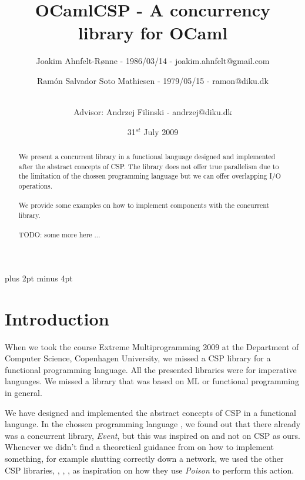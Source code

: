 \documentclass[a4paper,12pt]{article}
\title{OCamlCSP - A concurrency library for OCaml}
\author{Joakim Ahnfelt-Rønne - 1986/03/14 - joakim.ahnfelt@gmail.com \and 
        Ramón Salvador Soto Mathiesen - 1979/05/15 - ramon@diku.dk \and
        \\ Advisor: Andrzej Filinski - andrzej@diku.dk}
\date{31$^{st}$ July 2009}
\begin{document}
\maketitle

\newpage
{}
\begin{abstract}
We present a concurrent library in a functional language designed and
implemented after the abstract concepts of CSP\cite{hoare}. The library does
not offer true parallelism due to the limitation of the chossen programming
language but we can offer overlapping I/O operations.
\\ \\
We provide some examples on how to implement components with the concurrent
library.
\\ \\
TODO: some more here ...
\end{abstract}

\newpage
\setcounter{tocdepth}{2}
\setcounter{secttocdepth}{3}
\dosecttoc \tableofcontents
\newpage

\parindent=0pt
\parskip=8pt plus 2pt minus 4pt

\section{Introduction}
When we took the course Extreme Multiprogramming 2009 at the Department of
Computer Science, Copenhagen University, we missed a CSP\cite{hoare} library for
a functional programming language. All the presented libraries were for
imperative languages. We missed a library that was based on ML or functional
programming in general.

We have designed and implemented the abstract concepts of CSP in a functional
language. In the chossen programming language \cite{ocaml}, we found out
that there already was a concurrent library, {\it Event}, but this was inspired
on \cite{concurrentml} and not on CSP as ours. Whenever we didn't find a
theoretical guidance from \cite{hoare} on how to implement something, for
example shutting correctly down a network, we used the other CSP libraries,
\cite{pycsp}, \cite{jcsp}, \cite{cppcsp2}, as inspiration on how
they use {\it Poison} to perform this action.
\end{document}
